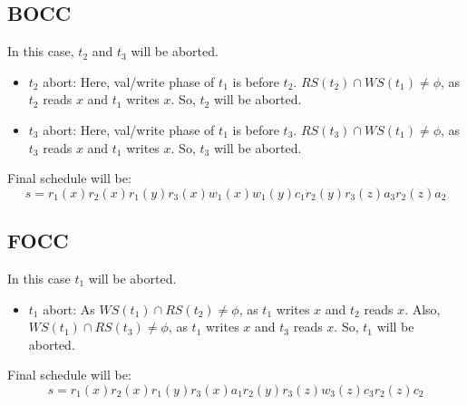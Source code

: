 \documentclass[12pt]{article}
\begin{document}
\subsection*{BOCC}
In this case, $t_2$ and $t_3$ will be aborted. 
\begin{itemize}
    \item $t_2$ abort: Here, val/write phase of $t_1$ is before $t_2$. $RS(t_2) \cap WS(t_1) \neq \phi$, as $t_2$ reads $x$ and $t_1$ writes $x$. So, $t_2$ will be aborted.
    \item $t_3$ abort: Here, val/write phase of $t_1$ is before $t_3$. $RS(t_3) \cap WS(t_1) \neq \phi$, as $t_3$ reads $x$ and $t_1$ writes $x$. So, $t_3$ will be aborted.
\end{itemize}
Final schedule will be:
\begin{equation*}
    s = r_1(x) r_2(x) r_1(y) r_3(x) w_1(x) w_1(y) c_1 r_2(y) r_3(z) a_3 r_2(z) a_2
\end{equation*}

\subsection*{FOCC}
In this case $t_1$ will be aborted.
\begin{itemize}
    \item $t_1$ abort: As $WS(t_1) \cap RS(t_2) \neq \phi$, as $t_1$ writes $x$ and $t_2$ reads $x$. Also, $WS(t_1) \cap RS(t_3) \neq \phi$, as $t_1$ writes $x$ and $t_3$ reads $x$. So, $t_1$ will be aborted.
\end{itemize}
Final schedule will be:
\begin{equation*}
    s = r_1(x) r_2(x) r_1(y) r_3(x) a_1 r_2(y) r_3(z) w_3(z) c_3 r_2(z) c_2
\end{equation*}
\end{document}
